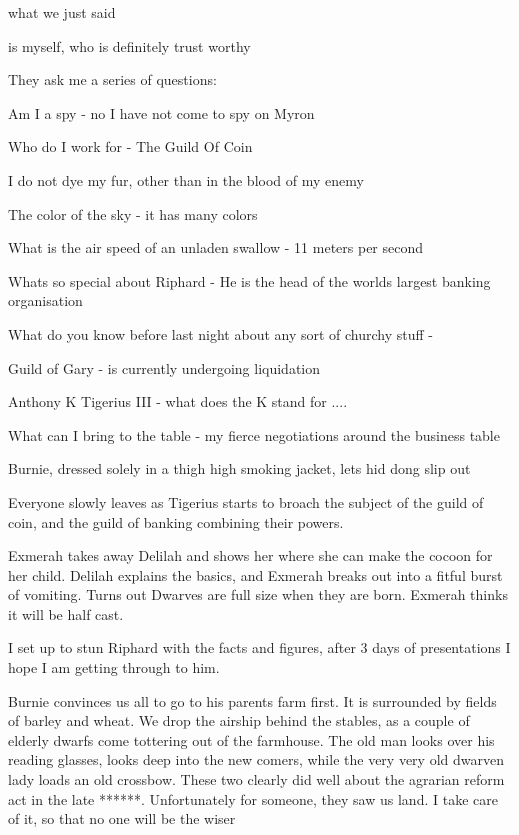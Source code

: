 what we just said\medskip

is myself, who is definitely trust worthy\medskip

They ask me a series of questions:\medskip

Am I a spy - no I have not come to spy on Myron\medskip

Who do I work for - The Guild Of Coin\medskip

I do not dye my fur, other than in the blood of my enemy\medskip

The color of the sky - it has many colors\medskip

What is the air speed of an unladen swallow - 11 meters per second\medskip

Whats so special about Riphard - He is the head of the worlds largest banking organisation\medskip

What do you know before last night about any sort of churchy stuff -\medskip

Guild of Gary - is currently undergoing liquidation\medskip

Anthony K Tigerius III - what does the K stand for ....\medskip

What can I bring to the table - my fierce negotiations around the business table\medskip

Burnie, dressed solely in a thigh high smoking jacket, lets hid dong slip out\medskip

Everyone slowly leaves as Tigerius starts to broach the subject of the guild of coin, and the guild of banking combining their powers.\medskip

Exmerah takes away Delilah and shows her where she can make the cocoon for her child. Delilah explains the basics, and Exmerah breaks out into a fitful burst of vomiting. Turns out Dwarves are full size when they are born. Exmerah thinks it will be half cast.\medskip

I set up to stun Riphard with the facts and figures, after 3 days of presentations I hope I am getting through to him.\medskip

Burnie convinces us all to go to his parents farm first. It is surrounded by fields of barley and wheat. We drop the airship behind the stables, as a couple of elderly dwarfs come tottering out of the farmhouse. The old man looks over his reading glasses, looks deep into the new comers, while the very very old dwarven lady loads an old crossbow. These two clearly did well about the agrarian reform act in the late ******. Unfortunately for someone, they saw us land. I take care of it, so that no one will be the wiser\medskip

